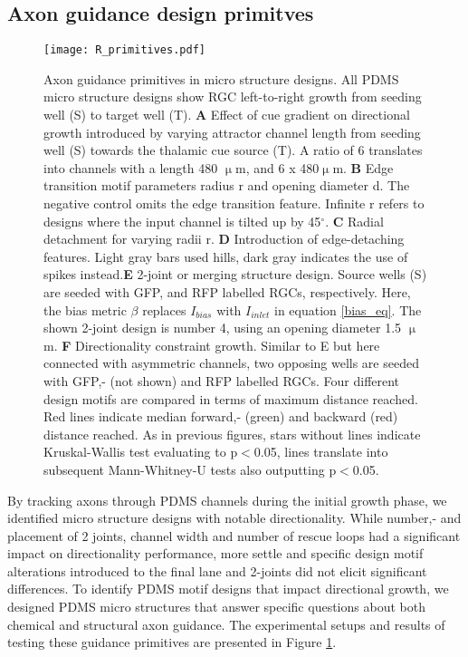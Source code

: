 \subsection{Axon guidance design primitves}
\begin{figure}[t!]
    \texttt{[image: R\_primitives.pdf]}
    \caption[Axon guidance primitives in micro structure designs]
        {Axon guidance primitives in micro structure designs. All PDMS micro
        structure designs show RGC left-to-right growth from seeding well (S) to
        target well (T). \textbf{A} Effect of cue gradient on directional growth
        introduced by varying attractor channel length from seeding well (S)
        towards the thalamic cue source (T). A ratio of 6 translates into
        channels with a length 480 $\upmu$m, and 6 x 480$\upmu$m. \textbf{B}
        Edge transition motif parameters radius r and opening diameter d. The
        negative control omits the edge transition feature. Infinite r refers to
        designs where the input channel is tilted up by 45$^{\circ}$. \textbf{C}
        Radial detachment for varying radii r. \textbf{D} Introduction of
        edge-detaching features. Light gray bars used hills, dark gray indicates
        the use of spikes instead.\textbf{E} 2-joint or merging structure
        design. Source wells (S) are seeded with GFP, and RFP labelled RGCs,
        respectively. Here, the bias metric $\beta$ replaces $I_{bias}$ with
        $I_{inlet}$ in equation \ref{bias_eq}. The shown 2-joint design is
        number 4, using an opening diameter 1.5 $\upmu$m. \textbf{F}
        Directionality constraint growth. Similar to E but here connected with
        asymmetric channels, two opposing wells are seeded with GFP,- (not
        shown) and RFP labelled RGCs. Four different design motifs are compared
        in terms of maximum distance reached. Red lines indicate median
        forward,- (green) and backward (red) distance reached. As in previous
        figures, stars without lines indicate Kruskal-Wallis test evaluating to
        p$<$0.05, lines translate into subsequent Mann-Whitney-U tests also
        outputting p$<$0.05.} 
    \label{R_primitives}
\end{figure}
By tracking axons through PDMS channels during the initial growth phase, we
identified micro structure designs with notable directionality. While number,-
and placement of 2 joints, channel width and number of rescue loops had a
significant impact on directionality performance, more settle and specific
design motif alterations introduced to the final lane and 2-joints did not
elicit significant differences. To identify PDMS motif designs that impact
directional growth, we designed PDMS micro structures that answer specific
questions about both chemical and structural axon guidance. The experimental
setups and results of testing these guidance primitives are presented in Figure
\ref{R_primitives}. \\

